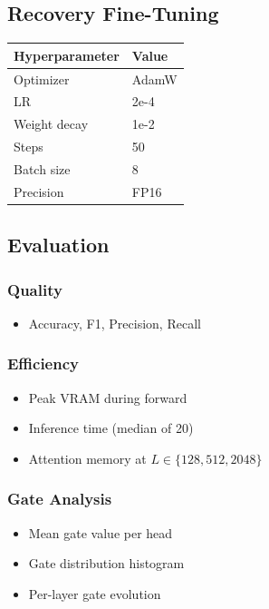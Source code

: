 \subsection{Recovery Fine-Tuning}

\begin{table}[H]
\centering
\small
\begin{tabular}{ll}
\toprule
\textbf{Hyperparameter} & \textbf{Value} \\
\midrule
Optimizer & AdamW \\
LR & 2e-4 \\
Weight decay & 1e-2 \\
Steps & 50 \\
Batch size & 8 \\
Precision & FP16 \\
\bottomrule
\end{tabular}
\end{table}

\subsection{Evaluation}

\subsubsection{Quality}
\begin{itemize}
\item Accuracy, F1, Precision, Recall

\end{itemize}
\subsubsection{Efficiency}
\begin{itemize}
\item Peak VRAM during forward
\item Inference time (median of 20)
\item Attention memory at $L \in \{128, 512, 2048\}$

\end{itemize}
\subsubsection{Gate Analysis}
\begin{itemize}
\item Mean gate value per head
\item Gate distribution histogram
\item Per-layer gate evolution

\end{itemize}
